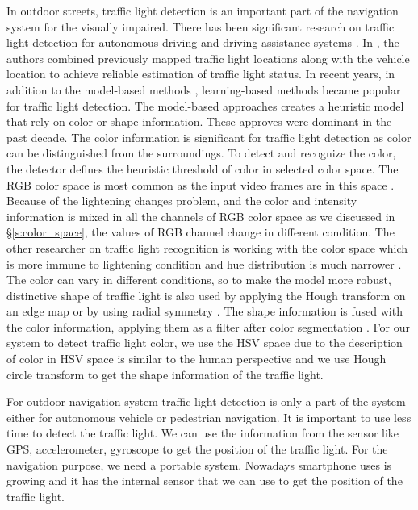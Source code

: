 In outdoor streets, traffic light detection is an important part of the navigation system for the visually impaired.
There has been significant research on traffic light detection for autonomous driving and driving assistance systems \cite{traffic_turan,selfdrive,traffic,traffic2,traffic3}.
In \cite{traffic_turan}, the authors combined previously mapped traffic light locations along with the vehicle location to achieve reliable estimation of traffic light status.
In recent years, in addition to the model-based methods \cite{model,model2}, learning-based methods \cite{survey_traffic} became popular for traffic light detection.
The model-based approaches creates a heuristic model that rely on color or shape information.
These approves were dominant in the past decade.
The color information is significant for traffic light detection as color can be distinguished from the surroundings.
To detect and recognize the color, the detector defines the heuristic threshold of color in selected color space.
The RGB color space is most common as the input video frames are in this space \cite{rgb2}.
Because of the lightening changes problem, and the color and intensity information is mixed in all the channels of  RGB color space as we discussed in \S\ref{s:color_space}, the values of RGB channel change in different condition.
The other researcher on traffic light recognition is working with the color space which is more immune to lightening condition and hue distribution is much narrower \cite{hsv2}.
The color can vary in different conditions, so to make the model more robust, distinctive shape of traffic light is also used by applying the Hough transform on an edge map \cite{hough,hough2,signalguru} or by using radial symmetry \cite{radial,radial2}.
The shape information is fused with the color information, applying them as a filter after color segmentation \cite{signalguru}.
For our system to detect traffic light color, we use the HSV space due to the description of color in HSV space is similar to the human perspective and we use Hough circle transform to get the shape information of the traffic light. 

For outdoor navigation system traffic light detection is only a part of the system either for autonomous vehicle or pedestrian navigation.
It is important to use less time to detect the traffic light.
We can use the information from the sensor like GPS, accelerometer, gyroscope to get the position of the traffic light. \cite{sensor,sensor2,sensor3}
For the navigation purpose, we need a portable system.
Nowadays smartphone uses is growing and it has the internal sensor that we can use to get the position of the traffic light.

